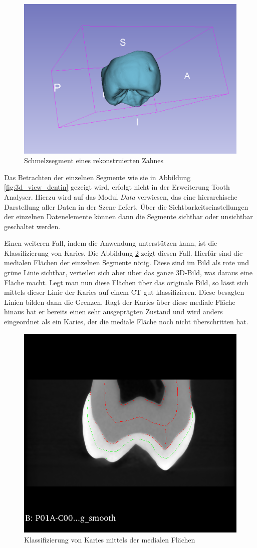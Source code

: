 \begin{figure}[h]
\begin{minipage}[b]{0.32\textwidth}
		\includegraphics[width=\textwidth]{img/3dViewEnamel.png}
		\caption{Schmelzsegment eines rekonstruierten Zahnes}
		\label{fig:3d_view_schmelz}
	\end{minipage}
\end{figure}

Das Betrachten der einzelnen Segmente wie sie in Abbildung \ref{fig:3d_view_dentin}
gezeigt wird, erfolgt nicht in der Erweiterung Tooth Analyser. Hierzu wird auf das
Modul \textit{Data} verwiesen, das eine hierarchische Darstellung aller Daten in
der Szene liefert. Über die Sichtbarkeitseinstellungen der einzelnen
Datenelemente können dann die Segmente sichtbar oder unsichtbar geschaltet
werden.

Einen weiteren Fall, indem die Anwendung unterstützen kann, ist die
Klassifizierung von Karies. Die Abbildung \ref{fig:classification} zeigt diesen Fall.
Hierfür sind die medialen Flächen der einzelnen Segmente nötig. Diese sind im Bild
als rote und grüne Linie sichtbar, verteilen sich aber über das ganze \ac{3D}-Bild,
was daraus eine Fläche macht. Legt man nun diese Flächen über das originale Bild,
so lässt sich mittels dieser Linie der Karies auf einem \ac{CT} gut klassifizieren.
Diese besagten Linien bilden dann die Grenzen. Ragt der Karies über diese mediale
Fläche hinaus hat er bereits einen sehr ausgeprägten Zustand und wird anders eingeordnet
als ein Karies, der die mediale Fläche noch nicht überschritten hat.

\begin{figure}[h]
	\centering
	\includegraphics[width=0.4 \textwidth]{img/classification.png}
	\caption{Klassifizierung von Karies mittels der medialen Flächen}
	\label{fig:classification}
\end{figure}

